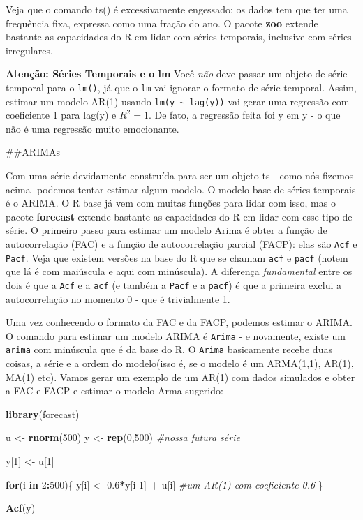 \documentclass[
]{book}
\newenvironment{Shaded}{\begin{snugshade}}{\end{snugshade}}
\newcommand{\CommentTok}[1]{\textcolor[rgb]{0.56,0.35,0.01}{\textit{#1}}}
\newcommand{\ControlFlowTok}[1]{\textcolor[rgb]{0.13,0.29,0.53}{\textbf{#1}}}
\newcommand{\DecValTok}[1]{\textcolor[rgb]{0.00,0.00,0.81}{#1}}
\newcommand{\FloatTok}[1]{\textcolor[rgb]{0.00,0.00,0.81}{#1}}
\newcommand{\KeywordTok}[1]{\textcolor[rgb]{0.13,0.29,0.53}{\textbf{#1}}}
\newcommand{\NormalTok}[1]{#1}
\newcommand{\OperatorTok}[1]{\textcolor[rgb]{0.81,0.36,0.00}{\textbf{#1}}}
\newcommand{\StringTok}[1]{\textcolor[rgb]{0.31,0.60,0.02}{#1}}
\begin{document}
Veja que o comando ts() é excessivamente engessado: os dados tem que ter uma frequência fixa, expressa como uma fração do ano. O pacote \textbf{zoo} extende bastante as capacidades do R em lidar com séries temporais, inclusive com séries irregulares.

\textbf{Atenção: Séries Temporais e o lm}
Você \emph{não} deve passar um objeto de série temporal para o \texttt{lm()}, já que o \texttt{lm} vai ignorar o formato de série temporal. Assim, estimar um modelo AR(1) usando \texttt{lm(y\ \textasciitilde{}\ lag(y))} vai gerar uma regressão com coeficiente 1 para lag(y) e \(R^2 = 1\). De fato, a regressão feita foi y em y - o que não é uma regressão muito emocionante.

\#\#ARIMAs

Com uma série devidamente construída para ser um objeto ts - como nós fizemos acima- podemos tentar estimar algum modelo. O modelo base de séries temporais é o ARIMA. O R base já vem com muitas funções para lidar com isso, mas o pacote \textbf{forecast} extende bastante as capacidades do R em lidar com esse tipo de série. O primeiro passo para estimar um modelo Arima é obter a função de autocorrelação (FAC) e a função de autocorrelação parcial (FACP): elas são \texttt{Acf} e \texttt{Pacf}. Veja que existem versões na base do R que se chamam \texttt{acf} e \texttt{pacf} (notem que lá é com maiúscula e aqui com minúscula). A diferença \emph{fundamental} entre os dois é que a \texttt{Acf} e a \texttt{acf} (e também a \texttt{Pacf} e a \texttt{pacf}) é que a primeira exclui a autocorrelação no momento 0 - que é trivialmente 1.

Uma vez conhecendo o formato da FAC e da FACP, podemos estimar o ARIMA. O comando para estimar um modelo ARIMA é \texttt{Arima} - e novamente, existe um \texttt{arima} com minúscula que é da base do R. O \texttt{Arima} basicamente recebe duas coisas, a série e a ordem do modelo(isso é, se o modelo é um ARMA(1,1), AR(1), MA(1) etc). Vamos gerar um exemplo de um AR(1) com dados simulados e obter a FAC e FACP e estimar o modelo Arma sugerido:

\begin{Shaded}
\begin{Highlighting}[]
\KeywordTok{library}\NormalTok{(forecast)}

\NormalTok{u \textless{}{-}}\StringTok{ }\KeywordTok{rnorm}\NormalTok{(}\DecValTok{500}\NormalTok{)}
\NormalTok{y \textless{}{-}}\StringTok{ }\KeywordTok{rep}\NormalTok{(}\DecValTok{0}\NormalTok{,}\DecValTok{500}\NormalTok{) }\CommentTok{\#nossa futura série}

\NormalTok{y[}\DecValTok{1}\NormalTok{] \textless{}{-}}\StringTok{ }\NormalTok{u[}\DecValTok{1}\NormalTok{]}

\ControlFlowTok{for}\NormalTok{(i }\ControlFlowTok{in} \DecValTok{2}\OperatorTok{:}\DecValTok{500}\NormalTok{)\{}
\NormalTok{  y[i] \textless{}{-}}\StringTok{ }\FloatTok{0.6}\OperatorTok{*}\NormalTok{y[i}\DecValTok{{-}1}\NormalTok{] }\OperatorTok{+}\StringTok{ }\NormalTok{u[i] }\CommentTok{\#um AR(1) com coeficiente 0.6}
\NormalTok{\}}

\KeywordTok{Acf}\NormalTok{(y)}
\end{Highlighting}
\end{Shaded}
\end{document}
